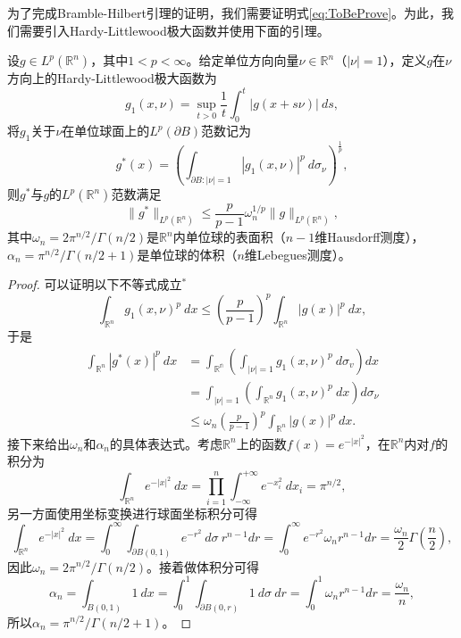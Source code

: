 \documentclass[a4paper,10pt]{ctexart}
\begin{document}
为了完成Bramble-Hilbert引理的证明，我们需要证明式\eqref{eq:ToBeProve}。为此，我们需要引入Hardy-Littlewood极大函数并使用下面的引理。
\begin{lemma}\label{lem:Hardy-Littlewood}
    设$ g\in L^p(\mathbb{R}^n) $，其中$ 1<p<\infty $。给定单位方向向量$ \nu\in \mathbb{R}^n $（$ |\nu|=1 $），定义$ g $在$ \nu $方向上的Hardy-Littlewood极大函数为
    \begin{equation}
        g_1(x,\nu) = \sup_{t>0} \frac{1}{t} \int_0^t |g(x+s \nu)|\ ds,
    \end{equation}
    将$ g_1 $关于$ \nu $在单位球面上的$ L^p(\partial B) $范数记为
    \begin{equation}
        g^*(x) = \left( \int_{\partial B:|\nu|=1} |g_1(x,\nu)|^p\ d\sigma_\nu \right)^{\frac{1}{p}},
    \end{equation}
    则$ g^* $与$ g $的$ L^p(\mathbb{R}^n) $范数满足
    \begin{equation}
        \| g^* \|_{L^p(\mathbb{R}^n)} \leqslant \frac{p}{p-1}\omega_n^{1 / p} \| g \|_{L^p(\mathbb{R}^n)},
    \end{equation}
    其中$ \omega_n = 2\pi^{n / 2} / \Gamma(n / 2) $是$ \mathbb{R}^n $内单位球的表面积（$ n-1 $维Hausdorff测度），$ \alpha_n = \pi^{n / 2} / \Gamma(n / 2+1) $是单位球的体积（$ n $维Lebegues测度）。
\end{lemma}
\begin{proof}
    可以证明以下不等式成立$ ^* $
    \begin{equation}
        \int_{\mathbb{R}^n} g_1(x,\nu)^p \ dx \leqslant \left( \frac{p}{p-1} \right)^p \int_{\mathbb{R}^n} |g(x)|^p\ dx,
    \end{equation}
    于是
    \[
        \begin{aligned}
            \int_{\mathbb{R}^n} |g^*(x)|^p\ dx &= \int_{\mathbb{R^n}}\left( \int_{|\nu|=1}g_1(x,\nu)^p\ d \sigma_v \right)  dx\\
            &= \int_{|\nu|=1} \left( \int_{\mathbb{R}^n} g_1(x,\nu)^p\ dx \right)d\sigma_\nu \\
            &\leqslant \omega_n\left( \frac{p}{p-1} \right)^p \int_{\mathbb{R}^n} |g(x)|^p\ dx.
        \end{aligned}
    \]
    接下来给出$ \omega_n $和$ \alpha_n $的具体表达式。考虑$ \mathbb{R}^n $上的函数$ f(x) = e^{-|x|^2} $，在$ \mathbb{R}^n $内对$ f $的积分为
    \[
        \int_{\mathbb{R}^n} e^{-|x|^2}\ dx = \prod_{i=1}^n \int_{-\infty}^{+\infty} e^{-x_i^2}\ dx_i  = \pi^{n / 2},
    \]
    另一方面使用坐标变换进行球面坐标积分可得
    \[
        \int_{\mathbb{R}^n} e^{-|x|^2}\ dx = \int_0^\infty \int_{\partial B(0,1)} e^{-r^2}\ d\sigma\ r^{n-1}dr  = \int_0^\infty e^{-r^2} \omega_n r^{n-1} dr = \frac{\omega_n}{2} \Gamma(\frac{n}{2}),
    \]
    因此$ \omega_n = 2\pi^{n / 2} / \Gamma(n / 2) $。接着做体积分可得
    \[
        \alpha_n = \int_{B(0,1)} 1\ dx = \int_0^1 \int_{\partial B(0,r)} 1\ d\sigma\ dr = \int_0^1 \omega_n r^{n-1} dr = \frac{\omega_n}{n},
    \]
    所以$ \alpha_n = \pi^{n / 2} / \Gamma(n / 2+1) $。
\end{proof}
\end{document}
